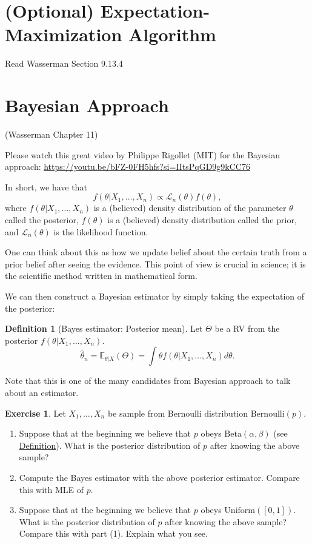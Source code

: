 \documentclass[
  openany]{book}
\theoremstyle{definition}
\newtheorem{definition}{Definition}[chapter]
\theoremstyle{definition}
\theoremstyle{definition}
\newtheorem{exercise}{Exercise}[chapter]
\theoremstyle{definition}
\theoremstyle{remark}
\begin{document}
\section{(Optional) Expectation-Maximization Algorithm}\label{optional-expectation-maximization-algorithm}

Read Wasserman Section 9.13.4

\section{Bayesian Approach}\label{bayesian-approach}

(Wasserman Chapter 11)

Please watch this great video by Philippe Rigollet (MIT) for the Bayesian approach:
\url{https://youtu.be/bFZ-0FH5hfs?si=IItsPqGD9g9kCC76}

In short, we have that
\[ f(\theta | X_1, \dots, X_n) \propto \mathcal{L}_n (\theta) f(\theta), \]
where \(f(\theta | X_1, \dots, X_n)\) is a (believed) density distribution of the parameter \(\theta\) called the posterior,
\(f(\theta)\) is a (believed) density distribution called the prior,
and \(\mathcal{L}_n(\theta)\) is the likelihood function.

One can think about this as how we update belief about the certain truth
from a prior belief after seeing the evidence.
This point of view is crucial in science; it is the scientific method written in mathematical form.

We can then construct a Bayesian estimator by simply taking the expectation of the posterior:

\begin{definition}[Bayes estimator: Posterior mean]
Let \(\Theta\) be a RV from the posterior \(f(\theta | X_1, \dots, X_n)\).
\[ \hat \theta_n = \mathbb{E}_{\theta|X}(\Theta) = \int \theta f(\theta | X_1, \dots, X_n) d\theta.\]
\end{definition}

Note that this is one of the many candidates from Bayesian approach to talk about an estimator.

\begin{exercise}

Let \(X_1, \dots, X_n\) be sample from Bernoulli distribution \(\mathrm{Bernoulli}(p)\).

\begin{enumerate}
\def\labelenumi{\arabic{enumi}.}
\item
  Suppose that at the beginning we believe that \(p\) obeys \(\mathrm{Beta}(\alpha, \beta)\) (see \href{https://en.wikipedia.org/wiki/Beta_distribution}{Definition}).
  What is the posterior distribution of \(p\) after knowing the above sample?
\item
  Compute the Bayes estimator with the above posterior estimator. Compare this with MLE of \(p\).
\item
  Suppose that at the beginning we believe that \(p\) obeys \(\mathrm{Uniform}([0,1])\).
  What is the posterior distribution of \(p\) after knowing the above sample? Compare this with part (1). Explain what you see.
\end{enumerate}

\end{exercise}
\end{document}
